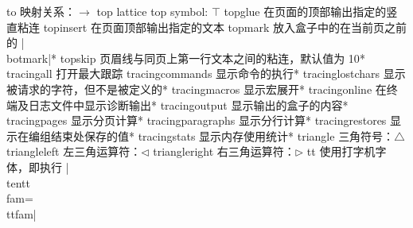 \capcs to {映射关系：$\to$}{}{}
\capcs top {lattice top symbol: $\top$}{}{}
\capcs topglue {在页面的顶部输出指定的竖直粘连}{}{}
\capcs topinsert {在页面顶部输出指定的文本}{}{}
\capcs topmark {放入盒子中的在当前页之前的 |\\botmark|}*{}
\capcs topskip {页眉线与同页上第一行文本之间的粘连，默认值为 10\pt}*{}
\capcs tracingall {打开最大跟踪}{}{}
\capcs tracingcommands {显示命令的执行}*{}
\capcs tracinglostchars {显示被请求的字符，但不是被定义的}*{}
\capcs tracingmacros {显示宏展开}*{}
\capcs tracingonline {在终端及日志文件中显示诊断输出}*{}
\capcs tracingoutput {显示输出的盒子的内容}*{}
\capcs tracingpages {显示分页计算}*{}
\capcs tracingparagraphs {显示分行计算}*{}
\capcs tracingrestores {显示在编组结束处保存的值}*{}
\capcs tracingstats {显示内存使用统计}*{}
\capcs triangle {三角符号：$\triangle$}{}{}
\capcs triangleleft {左三角运算符：$\triangleleft$}{}{}
\capcs triangleright {右三角运算符：$\triangleright$}{}{}
\capcs tt {使用打字机字体，即执行 |\\tentt\\fam=\\ttfam|}{}{}
